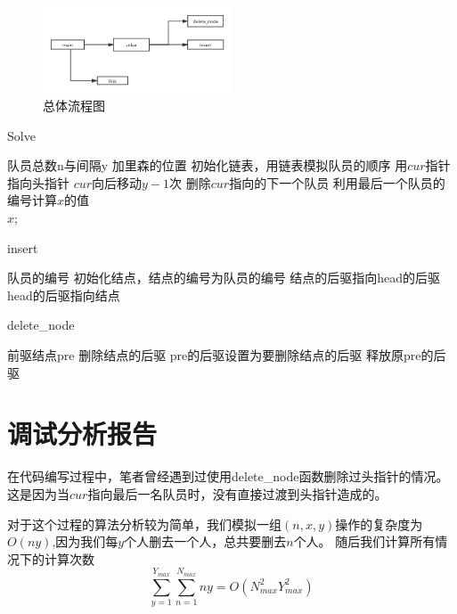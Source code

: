 \begin{figure}[H]
   \centering
   \includegraphics[width=0.5\textwidth]{images/process.png}
   \caption{总体流程图}
\end{figure}


\begin{algorithm}[htb] 
\caption{ Solve } 
\label{alg:Framwork} 
\begin{algorithmic}[1]
\Require
队员总数n与间隔y
\Ensure
加里森的位置
\State 初始化链表，用链表模拟队员的顺序
\State 用$cur$指针指向头指针
\State $cur$向后移动$y-1$次
\State 删除$cur$指向的下一个队员
\EndWhile
\State 利用最后一个队员的编号计算$x$的值 \\
\Return $x$; 
\end{algorithmic} 
\end{algorithm}

\begin{algorithm}[htb] 
   \caption{ insert } 
   \label{alg:Framwork} 
   \begin{algorithmic}[1]
   \Require
   队员的编号
   \State 初始化结点，结点的编号为队员的编号
   \State 结点的后驱指向head的后驱
   \State head的后驱指向结点
   \end{algorithmic} 
   \end{algorithm}

   \begin{algorithm}[htb] 
\caption{ delete\_node } 
\label{alg:Framwork} 
\begin{algorithmic}[1]
\Require
前驱结点pre
\Ensure
删除结点的后驱
\State pre的后驱设置为要删除结点的后驱
\State 释放原pre的后驱
\end{algorithmic} 
\end{algorithm}


\section{调试分析报告}
   在代码编写过程中，笔者曾经遇到过使用delete\_node函数删除过头指针的情况。
   这是因为当$cur$指向最后一名队员时，没有直接过渡到头指针造成的。


   对于这个过程的算法分析较为简单，我们模拟一组$(n, x, y)$操作的复杂度为$O(ny)$,因为我们每$y$个人删去一个人，总共要删去$n$个人。
   随后我们计算所有情况下的计算次数$$ \sum^{Y_{max}}_{y = 1}{\sum^{N_{max}}_{n = 1}{ny}} = O(N_{max}^2Y_{max}^2)$$

